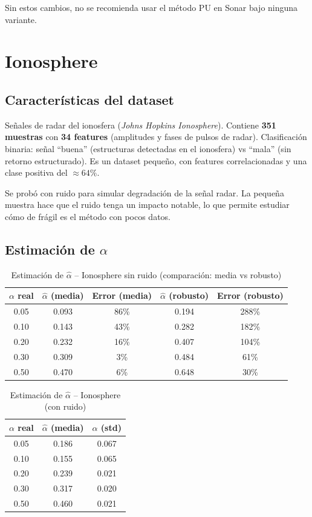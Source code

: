 \documentclass[a4paper,11pt]{article}
\begin{document}
Sin estos cambios, no se recomienda usar el método PU en Sonar bajo ninguna variante.

\section{Ionosphere}

\subsection{Características del dataset}

Señales de radar del ionosfera (\textit{Johns Hopkins Ionosphere}). Contiene \textbf{351 muestras} con \textbf{34 features} (amplitudes y fases de pulsos de radar). Clasificación binaria: señal ``buena'' (estructuras detectadas en el ionosfera) vs ``mala'' (sin retorno estructurado). Es un dataset pequeño, con features correlacionadas y una clase positiva del $\approx 64\%$.

Se probó con ruido para simular degradación de la señal radar. La pequeña muestra hace que el ruido tenga un impacto notable, lo que permite estudiar cómo de frágil es el método con pocos datos.

\subsection{Estimación de $\alpha$}

\begin{table}[H]
\centering
\caption{Estimación de $\hat{\alpha}$ -- Ionosphere sin ruido (comparación: media vs robusto)}
\begin{tabular}{ccccc}
\toprule
$\alpha$ real & $\hat{\alpha}$ (media) & Error (media) & $\hat{\alpha}$ (robusto) & Error (robusto) \\
\midrule
0.05 & 0.093 & 86\% & 0.194 & 288\% \\
0.10 & 0.143 & 43\% & 0.282 & 182\% \\
0.20 & 0.232 & 16\% & 0.407 & 104\% \\
0.30 & 0.309 & 3\% & 0.484 & 61\% \\
0.50 & 0.470 & 6\% & 0.648 & 30\% \\
\bottomrule
\end{tabular}
\end{table}

\begin{table}[H]
\centering
\caption{Estimación de $\hat{\alpha}$ -- Ionosphere (con ruido)}
\begin{tabular}{ccc}
\toprule
$\alpha$ real & $\hat{\alpha}$ (media) & $\hat{\alpha}$ (std) \\
\midrule
0.05 & 0.186 & 0.067 \\
0.10 & 0.155 & 0.065 \\
0.20 & 0.239 & 0.021 \\
0.30 & 0.317 & 0.020 \\
0.50 & 0.460 & 0.021 \\
\bottomrule
\end{tabular}
\end{table}
\end{document}
